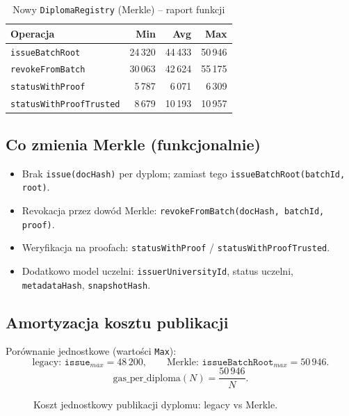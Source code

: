 \documentclass[11pt,a4paper]{article}
\begin{document}
\begin{table}[h]
\centering
\caption{Nowy \texttt{DiplomaRegistry} (Merkle) -- raport funkcji}
\begin{tabular}{lrrr}
\toprule
Operacja & Min & Avg & Max \\
\midrule
\texttt{issueBatchRoot} & 24\,320 & 44\,433 & 50\,946 \\
\texttt{revokeFromBatch} & 30\,063 & 42\,624 & 55\,175 \\
\texttt{statusWithProof} & 5\,787 & 6\,071 & 6\,309 \\
\texttt{statusWithProofTrusted} & 8\,679 & 10\,193 & 10\,957 \\
\bottomrule
\end{tabular}
\end{table}

\subsection{Co zmienia Merkle (funkcjonalnie)}
\begin{itemize}
  \item Brak \texttt{issue(docHash)} per dyplom; zamiast tego \texttt{issueBatchRoot(batchId, root)}.
  \item Revokacja przez dowód Merkle: \texttt{revokeFromBatch(docHash, batchId, proof)}.
  \item Weryfikacja na proofach: \texttt{statusWithProof} / \texttt{statusWithProofTrusted}.
  \item Dodatkowo model uczelni: \texttt{issuerUniversityId}, status uczelni, \texttt{metadataHash}, \texttt{snapshotHash}.
\end{itemize}

\subsection{Amortyzacja kosztu publikacji}
Porównanie jednostkowe (wartości \texttt{Max}):
\[
\text{legacy: } \texttt{issue}_{max}=48\,200,\qquad
\text{Merkle: } \texttt{issueBatchRoot}_{max}=50\,946.
\]
\[
\text{gas\_per\_diploma}(N)=\frac{50\,946}{N}.
\]

\begin{figure}[h]
\centering
{}
\caption{Koszt jednostkowy publikacji dyplomu: legacy vs Merkle.}
\end{figure}
\end{document}
